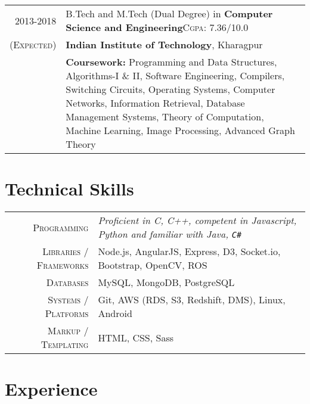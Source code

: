 \documentclass[a4paper,10pt]{extarticle} %
\begin{document}
\begin{tabular}{r|p{17.5cm}}	
2013-2018 & B.Tech and M.Tech (Dual Degree) in \textbf{Computer Science and Engineering}\hfill\textsc{Cgpa}: 7.36/10.0\\
\textsc{(Expected)}&\textbf{Indian Institute of Technology}, Kharagpur\\
&\textbf{Coursework: }{Programming and Data Structures, Algorithms-I \& II, Software Engineering, Compilers, Switching Circuits, Operating Systems, Computer Networks, Information Retrieval, Database Management Systems, Theory of Computation, Machine Learning, Image Processing, Advanced Graph Theory}
\end{tabular}


\section{Technical Skills}

\begin{tabular}{r|p{17.5cm}}
\textsc{Programming} & \itshape{Proficient in} C, C++, \itshape{competent in} Javascript, Python and \itshape{familiar with} Java, \verb!C#! \\
\textsc{Libraries / Frameworks} & Node.js, AngularJS, Express, D3, Socket.io, Bootstrap, OpenCV, ROS\\
\textsc{Databases} & MySQL, MongoDB, PostgreSQL\\
\textsc{Systems / Platforms} & Git, AWS (RDS, S3, Redshift, DMS), Linux, Android\\
\textsc{Markup / Templating} & HTML, CSS, Sass
\end{tabular}

\section{Experience}
\end{document}
